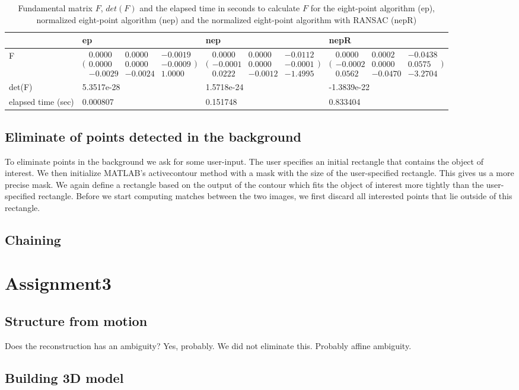 \documentclass[12pt]{amsart}
\begin{document}
\begin{table}
    \begin{tabular}{l|l|l|l}
    ~                  & ep & nep & nepR \\ \hline
    F                  
    & $\bigl(\begin{smallmatrix}0.0000&0.0000&-0.0019\\ 0.0000&0.0000&-0.0009\\-0.0029&-0.0024&1.0000\end{smallmatrix} \bigr)$ 
    & $\bigl(\begin{smallmatrix}0.0000&0.0000&-0.0112\\ -0.0001&0.0000&-0.0001\\0.0222&-0.0012&-1.4995\end{smallmatrix} \bigr)$                      
    & $\bigl(\begin{smallmatrix}0.0000&0.0002&-0.0438\\ -0.0002&0.0000&0.0575\\0.0562&-0.0470&-3.2704\end{smallmatrix} \bigr)$                                  \\ \hline
    det(F)             & 5.3517e-28  & 1.5718e-24             & -1.3839e-22                        \\ \hline
    elapsed time (sec) & 0.000807    & 0.151748               & 0.833404                           \\
    \end{tabular}
    \label{fund}
    \caption{Fundamental matrix $F$, $\textit{det}(F)$ and the elapsed time in seconds to calculate $F$ for the eight-point algorithm (ep), normalized eight-point algorithm (nep) and the normalized eight-point algorithm with RANSAC (nepR)}
\end{table}
\subsection{Eliminate of points detected in the background}
\label{background}
To eliminate points in the background we ask for some user-input. The user specifies an initial rectangle that contains the object of interest. We then initialize MATLAB's activecontour method with a mask with the size of the user-specified rectangle. This gives us a more precise mask. We again define a rectangle based on the output of the contour which fits the object of interest more tightly than the user-specified rectangle. Before we start computing matches between the two images, we first discard all interested points that lie outside of this rectangle. 
\subsection{Chaining}
\section{Assignment3}
\subsection{Structure from motion}
Does the reconstruction has an ambiguity? Yes, probably. We did not eliminate this. Probably affine ambiguity. 
\subsection{Building 3D model}
\end{document}
